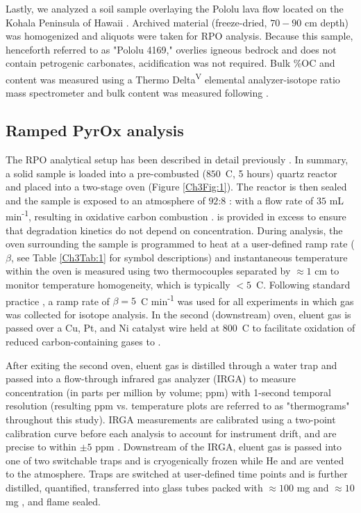 Lastly, we analyzed a soil sample overlaying the Pololu lava flow located on the Kohala Peninsula of Hawaii \citep[$20.15$\textdegree\ N, $155.83$\textdegree\ W;][]{Chadwick:2007hc}. Archived material (freeze-dried, $70 - 90$ cm depth) was homogenized and aliquots were taken for RPO analysis. Because this sample, henceforth referred to as "Pololu 4169," overlies igneous bedrock and does not contain petrogenic carbonates, acidification was not required. Bulk \%OC and  content was measured using a Thermo Delta\textsuperscript{V} elemental analyzer-isotope ratio mass spectrometer and bulk  content was measured following \citet{McNichol:1994ty}.

\subsection{Ramped PyrOx analysis}

The RPO analytical setup has been described in detail previously \citep{Rosenheim:2008ed,Hemingway:2016rc}. In summary, a solid sample is loaded into a pre-combusted ($850$\textdegree\ C, 5 hours) quartz reactor and placed into a two-stage oven (Figure \ref{Ch3Fig:1}). The reactor is then sealed and the sample is exposed to an atmosphere of $92$:$8$ : with a flow rate of $35$ mL min\textsuperscript{-1}, resulting in oxidative carbon combustion \citep[\textit{c.f.} pyrolysis as described in][]{Rosenheim:2008ed}.  is provided in excess to ensure that degradation kinetics do not depend on  concentration. During analysis, the oven surrounding the sample is programmed to heat at a user-defined ramp rate ($\beta$, see Table \ref{Ch3Tab:1} for symbol descriptions) and instantaneous temperature within the oven is measured using two thermocouples separated by $\approx 1$ cm to monitor temperature homogeneity, which is typically $< 5$\textdegree\ C. Following standard practice \citep{Rosenheim:2008ed}, a ramp rate of $\beta = 5$\textdegree\ C min\textsuperscript{-1} was used for all experiments in which  gas was collected for isotope analysis. In the second (downstream) oven, eluent gas is passed over a Cu, Pt, and Ni catalyst wire held at $800$\textdegree\ C to facilitate oxidation of reduced carbon-containing gases to . 

After exiting the second oven, eluent gas is distilled through a water trap and passed into a flow-through infrared gas analyzer (IRGA) to measure  concentration (in parts per million by volume; ppm) with 1-second temporal resolution (resulting ppm vs. temperature plots are referred to as "thermograms" throughout this study). IRGA measurements are calibrated using a two-point calibration curve before each analysis to account for instrument drift, and are precise to within $\pm 5$ ppm \citep{Hemingway:2016rc}. Downstream of the IRGA, eluent gas is passed into one of two switchable traps and  is cryogenically frozen while He and  are vented to the atmosphere. Traps are switched at user-defined time points and  is further distilled, quantified, transferred into glass tubes packed with $\approx 100$ mg  and $\approx 10$ mg , and flame sealed. 

